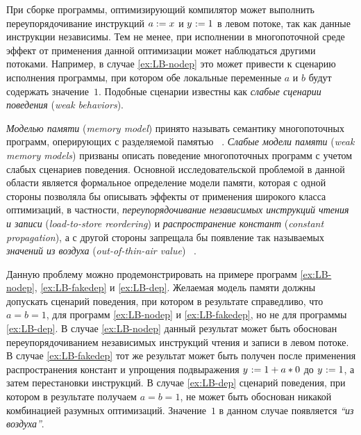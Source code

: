 При сборке программы, оптимизирующий компилятор
может выполнить переупорядочивание инструкций
$a \;{:=}\;{x}^{}$ и ${y}^{}\;{:=}\;1$ в левом потоке, 
так как данные инструкции независимы. 
Тем не менее, при исполнении в многопоточной среде 
эффект от применения данной оптимизации  
может наблюдаться другими потоками. 
Например, в случае \ref{ex:LB-nodep} 
это может привести к сценарию исполнения программы,
при котором обе локальные переменные $a$ и $b$
будут содержать значение~$1$. Подобные сценарии известны как 
\emph{слабые сценарии поведения} (\emph{weak behaviors}).

\emph{Моделью памяти} (\emph{memory model}) принято называть семантику 
многопоточных программ, оперирующих с разделяемой памятью%
~\cite{Moiseenko-al:PCS21}. 
\emph{Слабые модели памяти} (\emph{weak memory models}) 
призваны описать поведение многопоточных программ 
с учетом слабых сценариев поведения. 
Основной исследовательской проблемой в данной области
является формальное определение модели памяти, 
которая с одной стороны позволяла бы описывать 
эффекты от применения широкого класса оптимизаций, 
в частности, \emph{переупорядочивание независимых инструкций чтения и записи}
(\emph{load-to-store reordering}) и 
\emph{распространение констант} (\emph{constant propagation}),
а с другой стороны запрещала бы появление 
так называемых \emph{значений из воздуха} (\emph{out-of-thin-air value})%
~\cite{Moiseenko-al:PCS21,Batty-al:ESOP15}.

Данную проблему можно продемонстрировать на примере 
программ \ref{ex:LB-nodep}, \ref{ex:LB-fakedep} и \ref{ex:LB-dep}.
Желаемая модель памяти должны допускать сценарий 
поведения, при котором в результате справедливо, что $a = b = 1$,
для программ \ref{ex:LB-nodep} и \ref{ex:LB-fakedep}, 
но не для программы \ref{ex:LB-dep}.
В случае \ref{ex:LB-nodep} данный результат может быть 
обоснован переупорядочиванием независимых инструкций чтения и записи
в левом потоке. В случае \ref{ex:LB-fakedep} тот же результат 
может быть получен после применения распространения констант
и упрощения подвыражения ${y}^{}\;{:=}\;1 + a * 0$ до ${y}^{}\;{:=}\;1$,
а затем перестановки инструкций. 
В случае \ref{ex:LB-dep} сценарий поведения, 
при котором в результате получаем $a = b = 1$,
не может быть обоснован никакой комбинацией разумных оптимизаций.
Значение~$1$ в данном случае появляется \emph{``из воздуха''}.

